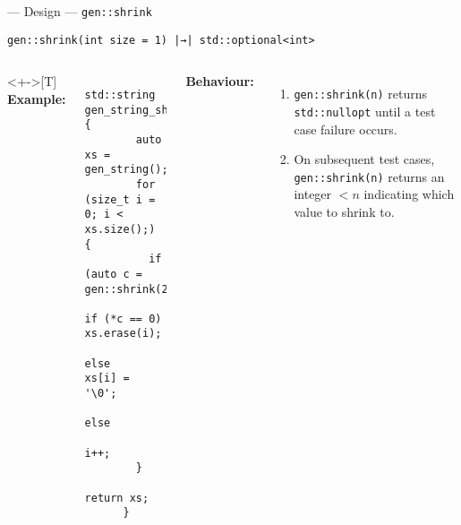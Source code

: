 \begin{frame}[fragile,t]{\halcheck{} --- Design --- \texttt{gen::shrink}}
  \begin{center}
    \texttt{gen::shrink(int size = 1) |→| std::optional<int>}
  \end{center}


  \begin{columns}<+->[T]
    \textbf{Example:}

    \begin{verbatim}
      std::string gen_string_shrink() {
        auto xs = gen_string();
        for (size_t i = 0; i < xs.size();) {
          if (auto c = gen::shrink(2))
            if (*c == 0) xs.erase(i);
            else         xs[i] = '\0';
          else
            i++;
        }
        return xs;
      }
    \end{verbatim}

    \textbf{Behaviour:}
    \begin{enumerate}
      \item<+-> \texttt{gen::shrink(n)} returns \texttt{std::nullopt} until a test case failure occurs.
      \item<+> On subsequent test cases, \texttt{gen::shrink(n)} returns an integer $< n$ indicating which value to shrink to.
    \end{enumerate}
  \end{columns}
\end{frame}

